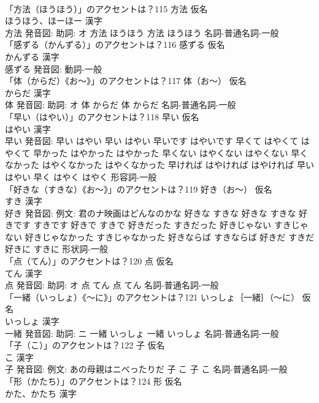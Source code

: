 \documentclass[8pt]{extreport}
\begin{document}
\begin{CJK}{UTF8}{min}
\\	「方法（ほうほう）」のアクセントは？115	方法 仮名　
\\	ほうほう、ほーほー 漢字　
\\	方法 発音図: 助詞: オ	方法 ほうほう		方法 ほうほう				名詞-普通名詞-一般 
\\	「感ずる（かんずる）」のアクセントは？116	感ずる 仮名　
\\	かんずる 漢字　
\\	感ずる 発音図:							動詞-一般 
\\	「体（からだ）《お〜》」のアクセントは？117	体（お〜） 仮名　
\\	からだ 漢字　
\\	体 発音図: 助詞: オ	体 からだ		体 からだ				名詞-普通名詞-一般 
\\	「早い（はやい）」のアクセントは？118	早い 仮名　
\\	はやい 漢字　
\\	早い 発音図:	早い はやい		早い はやい 早いです はやいです 早くて はやくて はやくて 早かった はやかった はやかった 早くない はやくない はやくない 早くなかった はやくなかった はやくなかった 早ければ はやければ はやければ 早い はやい 早く はやく はやく				形容詞-一般 
\\	「好きな（すきな）《お〜》」のアクセントは？119	好き（お〜） 仮名　
\\	すき 漢字　
\\	好き 発音図: 例文: 君のナ映画はどんなのかな	好きな すきな		好きな すきな 好きです すきです 好きで すきで 好きだった すきだった 好きじゃない すきじゃない 好きじゃなかった すきじゃなかった 好きならば すきならば 好きだ すきだ 好きに すきに				形状詞-一般 
\\	「点（てん）」のアクセントは？120	点 仮名　
\\	てん 漢字　
\\	点 発音図: 助詞: オ	点 てん		点 てん				名詞-普通名詞-一般 
\\	「一緒（いっしょ）《〜に》」のアクセントは？121	いっしょ｛一緒｝（〜に） 仮名　
\\	いっしょ 漢字　
\\	一緒 発音図: 助詞: ニ	一緒 いっしょ		一緒 いっしょ				名詞-普通名詞-一般 
\\	「子（こ）」のアクセントは？122	子 仮名　
\\	こ 漢字　
\\	子 発音図: 例文: あの母親はニべったりだ	子 こ		子 こ				名詞-普通名詞-一般 
\\	「形（かたち）」のアクセントは？124	形 仮名　
\\	かた、かたち 漢字　

\end{CJK}
\end{document}
